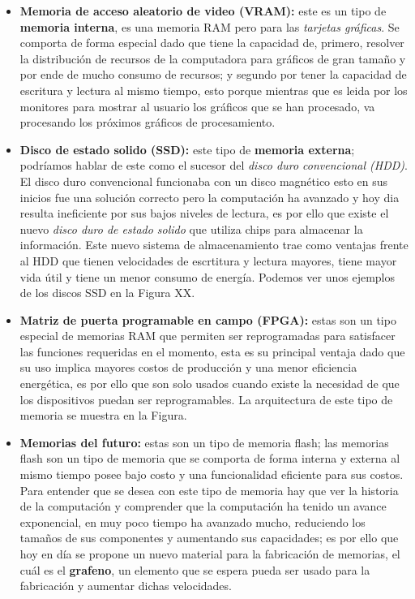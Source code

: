 \documentclass[conference]{IEEEtran}
\begin{document}
\begin{itemize}
    \item \textbf{Memoria de acceso aleatorio de video (VRAM):} este es un tipo de
    \textbf{memoria interna}, es una memoria RAM pero para las \textit{tarjetas gr\'aficas}.
    Se comporta de forma especial dado que tiene la capacidad de, primero, resolver la distribuci\'on
    de recursos de la computadora para gr\'aficos de gran tama\~no y por ende de mucho consumo de
    recursos; y segundo por tener la capacidad de escritura y lectura al mismo tiempo, esto porque
    mientras que es leida por los monitores para mostrar al usuario los gr\'aficos que se han
    procesado, va procesando los pr\'oximos gr\'aficos de procesamiento.
    
    \item \textbf{Disco de estado solido (SSD):} este tipo de \textbf{memoria externa};
    podr\'iamos hablar de este como el sucesor del \textit{disco duro convencional (HDD)}.
    El disco duro convencional funcionaba con un disco magn\'etico esto en sus inicios fue
    una soluci\'on correcto pero la computaci\'on ha avanzado y hoy dia resulta ineficiente
    por sus bajos niveles de lectura, es por ello que existe el nuevo \textit{disco duro de
    estado solido} que utiliza chips para almacenar la informaci\'on. Este nuevo sistema de
    almacenamiento trae como ventajas frente al HDD que tienen velocidades de escrtitura y
    lectura mayores, tiene mayor vida \'util y tiene un menor consumo de energ\'ia. Podemos
    ver unos ejemplos de los discos SSD en la Figura XX.
    
    \item \textbf{Matriz de puerta programable en campo (FPGA):} estas son un tipo especial de
    memorias RAM que permiten ser reprogramadas para satisfacer las funciones requeridas en el
    momento, esta es su principal ventaja dado que su uso implica mayores costos de producci\'on y
    una menor eficiencia energ\'etica, es por ello que son solo usados cuando existe la necesidad
    de que los dispositivos puedan ser reprogramables. La arquitectura de este tipo de memoria se
    muestra en la Figura.
    
    \item \textbf{Memorias del futuro:} estas son un tipo de memoria flash; las memorias flash son
    un tipo de memoria que se comporta de forma interna y externa al mismo tiempo posee bajo costo
    y una funcionalidad eficiente para sus costos. Para entender que se desea con este tipo de
    memoria hay que ver la historia de la computaci\'on y comprender que la computaci\'on ha tenido
    un avance exponencial, en muy poco tiempo ha avanzado mucho, reduciendo los tama\~nos de sus
    componentes y aumentando sus capacidades; es por ello que hoy en d\'ia se propone un nuevo
    material para la fabricaci\'on de memorias, el cu\'al es el \textbf{grafeno}, un elemento que
    se espera pueda ser usado para la fabricaci\'on y aumentar dichas velocidades. 
\end{itemize}
\end{document}
